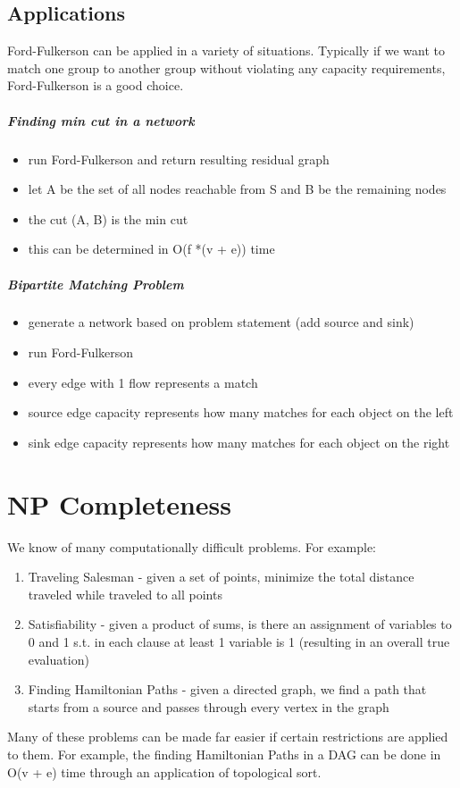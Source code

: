 \section{Applications}
Ford-Fulkerson can be applied in a variety of situations. Typically if we want to match one group to another group without violating any capacity requirements, Ford-Fulkerson is a good choice.
\paragraph{Finding min cut in a network}
\begin{itemize}
    \item run Ford-Fulkerson and return resulting residual graph
    \item let A be the set of all nodes reachable from S and B be the remaining nodes
    \item the cut (A, B) is the min cut
    \item this can be determined in O(f *(v + e)) time
\end{itemize}

\paragraph{Bipartite Matching Problem}
\begin{itemize}
    \item generate a network based on problem statement (add source and sink)
    \item run Ford-Fulkerson
    \item every edge with 1 flow represents a match
    \item source edge capacity represents how many matches for each object on the left
    \item sink edge capacity represents how many matches for each object on the right
    
\end{itemize}



\chapter{NP Completeness}
We know of many computationally difficult problems. For example:
\begin{enumerate}
    \item Traveling Salesman - given a set of points, minimize the total distance traveled while traveled to all points
    \item Satisfiability - given a product of sums, is there an assignment of variables to 0 and 1 s.t. in each clause at least 1 variable is 1 (resulting in an overall true evaluation)
    \item Finding Hamiltonian Paths - given a directed graph, we find a path that starts from a source and passes through every vertex in the graph
\end{enumerate}
Many of these problems can be made far easier if certain restrictions are applied to them. For example, the finding Hamiltonian Paths in a DAG can be done in O(v + e) time through an application of topological sort.

